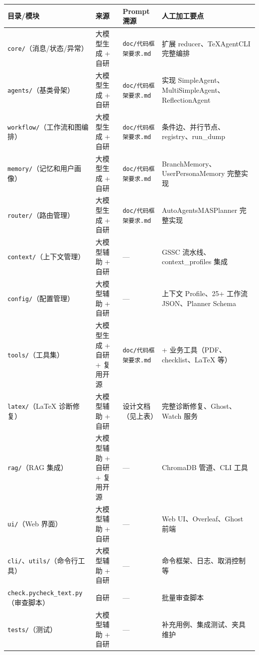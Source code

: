 \begin{longtable}{@{}>{\raggedright\arraybackslash}p{}>{\raggedright\arraybackslash}p{}>{\raggedright\arraybackslash}p{}>{\raggedright\arraybackslash}p{}@{}}
\toprule
\textbf{目录/模块} & \textbf{来源} & \textbf{Prompt 溯源} & \textbf{人工加工要点} \\
\midrule
\endhead
\texttt{core/}（消息/状态/异常） & 大模型生成 + 自研 & \texttt{doc/代码框架要求.md} & 扩展 reducer、TeXAgentCLI 完整编排 \\
\texttt{agents/}（基类骨架） & 大模型生成 + 自研 & \texttt{doc/代码框架要求.md} & 实现 SimpleAgent、MultiSimpleAgent、ReflectionAgent \\
\texttt{workflow/}（工作流和图编排） & 大模型生成 + 自研 & \texttt{doc/代码框架要求.md} & 条件边、并行节点、registry、run\_dump \\
\texttt{memory/}（记忆和用户画像） & 大模型生成 + 自研 & \texttt{doc/代码框架要求.md} & BranchMemory、UserPersonaMemory 完整实现 \\
\texttt{router/}（路由管理） & 大模型生成 + 自研 & \texttt{doc/代码框架要求.md} & AutoAgentsMASPlanner 完整实现 \\
\texttt{context/}（上下文管理） & 大模型辅助 + 自研 & — & GSSC 流水线、context\_profiles 集成 \\
\texttt{config/}（配置管理） & 大模型辅助 + 自研 & — & 上下文 Profile、25+ 工作流 JSON、Planner Schema \\
\texttt{tools/}（工具集） & 大模型生成 + 自研 + 复用开源 & \texttt{doc/代码框架要求.md} & 30+ 业务工具（PDF、checklist、LaTeX 等） \\
\texttt{latex/}（LaTeX 诊断修复） & 大模型辅助 + 自研 & 设计文档（见上表） & 完整诊断修复、Ghost、Watch 服务 \\
\texttt{rag/}（RAG 集成） & 大模型辅助 + 自研 + 复用开源 & — & ChromaDB 管道、CLI 工具 \\
\texttt{ui/}（Web 界面） & 大模型辅助 + 自研 & — & Web UI、Overleaf、Ghost 前端 \\
\texttt{cli/}、\texttt{utils/}（命令行工具） & 大模型辅助 + 自研 & — & 命令框架、日志、取消控制等 \\
\texttt{check.py}\newline\texttt{check\_text.py}（审查脚本） & 自研 & — & 批量审查脚本 \\
\texttt{tests/}（测试） & 大模型辅助 + 自研 & — & 补充用例、集成测试、夹具维护 \\
\bottomrule
\end{longtable}

